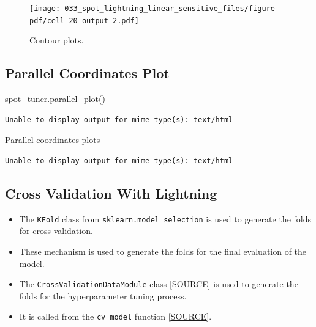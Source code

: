 \documentclass[
  letterpaper,
  DIV=11,
  numbers=noendperiod]{scrreprt}
\newenvironment{Shaded}{\begin{snugshade}}{\end{snugshade}}
\newcommand{\NormalTok}[1]{\textcolor[rgb]{0.00,0.23,0.31}{#1}}
\providecommand{\tightlist}{%
  \setlength{\itemsep}{0pt}\setlength{\parskip}{0pt}}\usepackage{longtable,booktabs,array}
\begin{document}
\begin{figure}[H]

{\centering \texttt{[image: 033\_spot\_lightning\_linear\_sensitive\_files/figure-pdf/cell-20-output-2.pdf]}

}

\caption{Contour plots.}

\end{figure}%

\subsection{Parallel Coordinates
Plot}\label{parallel-coordinates-plot-2}

\begin{Shaded}
\begin{Highlighting}[]
\NormalTok{spot\_tuner.parallel\_plot()}
\end{Highlighting}
\end{Shaded}

\begin{verbatim}
Unable to display output for mime type(s): text/html
\end{verbatim}

Parallel coordinates plots

\begin{verbatim}
Unable to display output for mime type(s): text/html
\end{verbatim}

\subsection{Cross Validation With
Lightning}\label{cross-validation-with-lightning-2}

\begin{itemize}
\tightlist
\item
  The \texttt{KFold} class from \texttt{sklearn.model\_selection} is
  used to generate the folds for cross-validation.
\item
  These mechanism is used to generate the folds for the final evaluation
  of the model.
\item
  The \texttt{CrossValidationDataModule} class
  \href{https://github.com/sequential-parameter-optimization/spotPython/blob/main/src/spotPython/data/lightcrossvalidationdatamodule.py}{{[}SOURCE{]}}
  is used to generate the folds for the hyperparameter tuning process.
\item
  It is called from the \texttt{cv\_model} function
  \href{https://github.com/sequential-parameter-optimization/spotPython/blob/main/src/spotPython/light/cvmodel.py}{{[}SOURCE{]}}.
\end{itemize}
\end{document}
